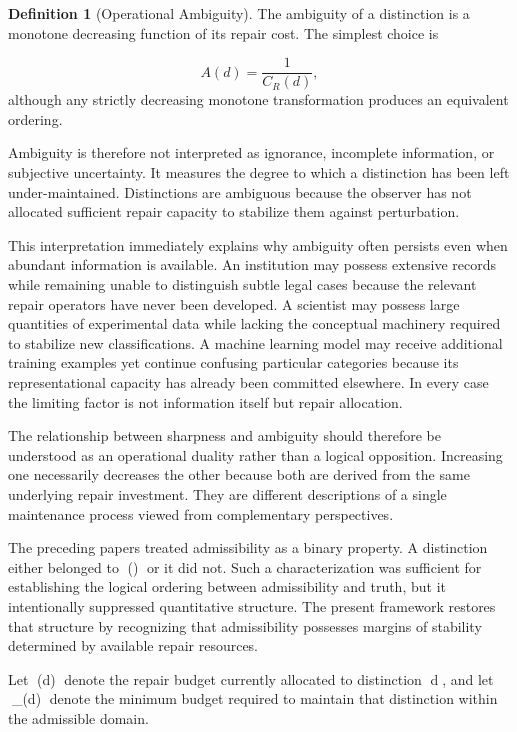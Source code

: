 \documentclass[12pt,oneside]{article}
\theoremstyle{plain}
\theoremstyle{definition}
\newtheorem{definition}[theorem]{Definition}
\theoremstyle{remark}
\DeclareMathOperator{\Rest}{Rest}
\begin{document}
\begin{definition}[Operational Ambiguity]
The ambiguity of a distinction is a monotone decreasing function of its repair cost. The simplest choice is

\[
A(d)=\frac{1}{C_R(d)},
\]
although any strictly decreasing monotone transformation produces an equivalent ordering.
\end{definition}

Ambiguity is therefore not interpreted as ignorance, incomplete information, or subjective uncertainty. It measures the degree to which a distinction has been left under-maintained. Distinctions are ambiguous because the observer has not allocated sufficient repair capacity to stabilize them against perturbation.

This interpretation immediately explains why ambiguity often persists even when abundant information is available. An institution may possess extensive records while remaining unable to distinguish subtle legal cases because the relevant repair operators have never been developed. A scientist may possess large quantities of experimental data while lacking the conceptual machinery required to stabilize new classifications. A machine learning model may receive additional training examples yet continue confusing particular categories because its representational capacity has already been committed elsewhere. In every case the limiting factor is not information itself but repair allocation.

The relationship between sharpness and ambiguity should therefore be understood as an operational duality rather than a logical opposition. Increasing one necessarily decreases the other because both are derived from the same underlying repair investment. They are different descriptions of a single maintenance process viewed from complementary perspectives.

The preceding papers treated admissibility as a binary property. A distinction either belonged to \Rest() or it did not. Such a characterization was sufficient for establishing the logical ordering between admissibility and truth, but it intentionally suppressed quantitative structure. The present framework restores that structure by recognizing that admissibility possesses margins of stability determined by available repair resources.

Let \Phi(d) denote the repair budget currently allocated to distinction d, and let \Phi_{\min}(d) denote the minimum budget required to maintain that distinction within the admissible domain.
\end{document}

